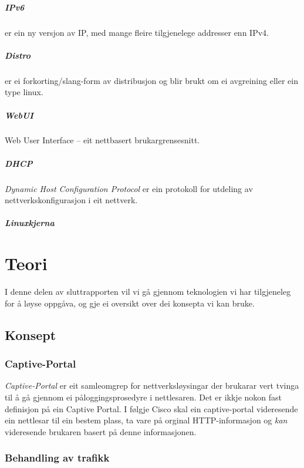 \documentclass[nynorsk,12pt,a4paper,oneside]{book}
\begin{document}
\paragraph{IPv6} er ein ny versjon av IP, med mange fleire tilgjenelege addresser enn IPv4. 
\paragraph{Distro} er ei forkorting/slang-form av distribusjon og blir brukt om ei avgreining eller ein type linux.
\paragraph{WebUI} Web User Interface -- eit nettbasert brukargrensesnitt. 
\paragraph{DHCP} \emph{Dynamic Host Configuration Protocol} er ein protokoll for utdeling av nettverkskonfigurasjon i eit nettverk. 
\paragraph{Linuxkjerna} 




\chapter{Teori}
I denne delen av sluttrapporten vil vi gå gjennom teknologien vi har tilgjeneleg for å løyse oppgåva, og gje ei oversikt over dei konsepta vi kan bruke. 

\section{Konsept}
\subsection{Captive-Portal}
\emph{Captive-Portal} er eit samleomgrep for nettverksløysingar der brukarar vert tvinga til å gå gjennom ei påloggingsprosedyre i nettlesaren. Det er ikkje nokon fast definisjon på ein Captive Portal. I følgje Cisco skal ein captive-portal videresende ein nettlesar til ein bestem plass, ta vare på orginal HTTP-informasjon og \emph{kan} videresende brukaren basert på denne informasjonen. \cite{ciscoCP}

\subsection{Behandling av trafikk}
\end{document}
